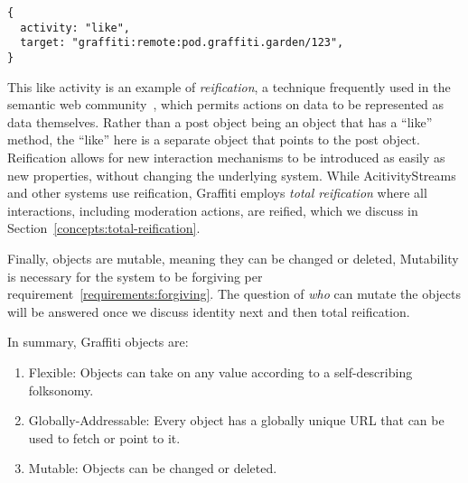 \begin{verbatim}
{
  activity: "like",
  target: "graffiti:remote:pod.graffiti.garden/123",
}
\end{verbatim}

This like activity is an example of \emph{reification},
a technique frequently used in the semantic web community~\cite{rdfprimer},
which permits actions on data to be represented as data themselves.
Rather than a post object being an object that has a ``like'' method,
the ``like'' here is a separate object that points to the post object.
Reification allows for new interaction mechanisms to be introduced as easily as new properties,
without changing the underlying system.
While AcitivityStreams and other systems use reification,
Graffiti employs \emph{total reification} where
all interactions, including moderation actions, are reified,
which we discuss in
Section~\ref{concepts:total-reification}.

Finally, objects are mutable, meaning they can be changed or deleted,
Mutability is necessary for the system to be forgiving per requirement~\ref{requirements:forgiving}.
The question of \emph{who} can mutate the objects
will be answered once we discuss identity next and then total reification.

In summary, Graffiti objects are:

\begin{enumerate}
\item
Flexible: Objects can take on any value according to a self-describing folksonomy.
\item
Globally-Addressable: Every object has a globally unique URL that can be used to fetch or point to it.
\item
Mutable: Objects can be changed or deleted.
\end{enumerate}


